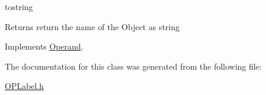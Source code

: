 tostring \begin{DoxyReturn}{Returns}
return the name of the Object as string 
\end{DoxyReturn}


Implements \hyperlink{classOperand_aaa9879d6c4fb8334c1b4d97dad614cef}{Operand}.

The documentation for this class was generated from the following file:\begin{DoxyCompactItemize}
\item 
\hyperlink{OPLabel_8h}{OPLabel.h}\end{DoxyCompactItemize}
